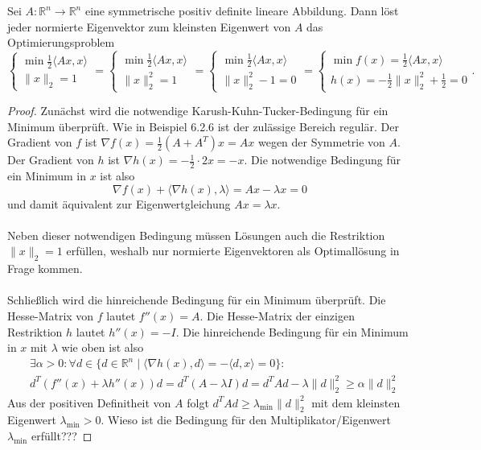 
Sei $A:\mathbb R^n\to \mathbb R^n$ eine symmetrische positiv definite lineare Abbildung. Dann löst jeder normierte Eigenvektor zum kleinsten Eigenwert von $A$ das Optimierungsproblem $$\begin{cases}\min \frac{1}{2}\langle Ax, x\rangle\\\|x\|_2=1\end{cases}=\begin{cases}\min \frac{1}{2}\langle Ax, x\rangle\\\|x\|_2^2=1\end{cases}=\begin{cases}\min \frac{1}{2}\langle Ax, x\rangle\\\|x\|_2^2-1=0\end{cases}=\begin{cases}\min f(x)=\frac{1}{2}\langle Ax, x\rangle\\h(x)=-\frac{1}{2}\|x\|_2^2+\frac{1}{2}=0\end{cases}.$$
\begin{proof}
Zunächst wird die notwendige Karush-Kuhn-Tucker-Bedingung für ein Minimum überprüft. Wie in Beispiel 6.2.6 ist der zulässige Bereich regulär. Der Gradient von $f$ ist $\nabla f(x)=\frac{1}{2}(A+A^T)x=Ax$ wegen der Symmetrie von $A$. Der Gradient von $h$ ist $\nabla h(x)=-\frac{1}{2}\cdot 2x=-x$. Die notwendige Bedingung für ein Minimum in $x$ ist also
$$\nabla f(x)+\langle \nabla h(x),\lambda\rangle=Ax -\lambda x=0$$
und damit äquivalent zur Eigenwertgleichung $Ax=\lambda x$.\\\\
Neben dieser notwendigen Bedingung müssen Lösungen auch die Restriktion $\|x\|_2=1$ erfüllen, weshalb nur normierte Eigenvektoren als Optimallösung in Frage kommen.\\\\
Schließlich wird die hinreichende Bedingung für ein Minimum überprüft. Die Hesse-Matrix von $f$ lautet $f''(x)=A$. Die Hesse-Matrix der einzigen Restriktion $h$ lautet $h''(x)=-I$. Die hinreichende Bedingung für ein Minimum in $x$ mit $\lambda$ wie oben ist also
\begin{align*}
&\exists \alpha>0:\forall d\in \{d\in\mathbb R^n\mid \langle \nabla h(x),d\rangle=-\langle d,x\rangle=0\}:\\
&d^T(f''(x)+\lambda h''(x))d=d^T(A-\lambda I)d=d^TAd-\lambda \|d\|_2^2\geq\alpha\|d\|_2^2\end{align*}
Aus der positiven Definitheit von $A$ folgt $d^TAd\geq\lambda_{\min}\|d\|_2^2$ mit dem kleinsten Eigenwert $\lambda_{\min}>0$. Wieso ist die Bedingung für den Multiplikator/Eigenwert $\lambda_{\min}$ erfüllt???
\end{proof}